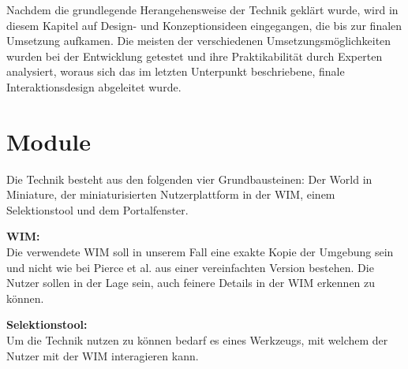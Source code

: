 Nachdem die grundlegende Herangehensweise der Technik geklärt wurde, wird in diesem Kapitel auf Design- und Konzeptionsideen eingegangen, die bis zur finalen Umsetzung aufkamen. Die meisten der verschiedenen Umsetzungsmöglichkeiten wurden bei der Entwicklung getestet und ihre Praktikabilität durch Experten analysiert, woraus sich das im letzten Unterpunkt beschriebene, finale Interaktionsdesign abgeleitet wurde.

\section{Module}
Die Technik besteht aus den folgenden vier Grundbausteinen: Der World in Miniature, der miniaturisierten Nutzerplattform in der WIM, einem Selektionstool und dem Portalfenster.

\textbf{WIM:}\\
Die verwendete WIM soll in unserem Fall eine exakte Kopie der Umgebung sein und nicht wie bei Pierce et al. aus einer vereinfachten Version bestehen. Die Nutzer sollen in der Lage sein, auch feinere Details in der WIM erkennen zu können. 

 \textbf{Selektionstool:}\\
Um die Technik nutzen zu können bedarf es eines Werkzeugs, mit welchem der Nutzer mit der WIM interagieren kann. 

